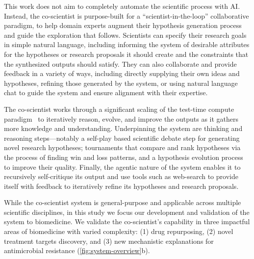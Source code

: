 This work does not aim to completely automate the scientific process with AI. Instead, the co-scientist is purpose-built for a ``scientist-in-the-loop'' collaborative paradigm, to help domain experts augment their hypothesis generation process and guide the exploration that follows. Scientists can specify their research goals in simple natural language, including informing the system of desirable attributes for the hypotheses or research proposals it should create and the constraints that the synthesized outputs should satisfy. They can also collaborate and provide feedback in a variety of ways, including directly supplying their own ideas and hypotheses, refining those generated by the system, or using natural language chat to guide the system and ensure alignment with their expertise.

The co-scientist works through a significant scaling of the test-time compute paradigm~\citep{snell2024scaling, brown2019superhuman, silver2016mastering} to iteratively reason, evolve, and improve the outputs as it gathers more knowledge and understanding. Underpinning the system are thinking and reasoning steps---notably a self-play based scientific debate step for generating novel research hypotheses; tournaments that compare and rank hypotheses via the process of finding win and loss patterns, and a hypothesis evolution process to improve their quality. Finally, the agentic nature of the system enables it to recursively self-critique its output and use tools such as web-search to provide itself with feedback to iteratively refine its hypotheses and research proposals.

While the co-scientist system is general-purpose and applicable across multiple scientific disciplines, in this study we focus our development and validation of the system to biomedicine. We validate the co-scientist's capability in three impactful areas of biomedicine with varied complexity: (1) drug repurposing, (2) novel treatment targets discovery, and (3) new mechanistic explanations for antimicrobial resistance (\cref{fig:system-overview}b).

